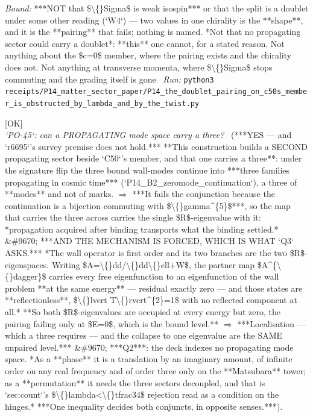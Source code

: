\begin{description}
 \emph{Bound:}  ***NOT that \$\textbackslash\{\}Sigma\$ is weak isospin*** or that the split is a doublet under some other reading (`W4`) --- two values in one chirality is the **shape**, and it is the **pairing** that fails; nothing is named. *Not that no propagating sector could carry a doublet*: **this** one cannot, for a stated reason. Not anything about the \$c=0\$ member, where the pairing exists and the chirality does not. Not anything at transverse momenta, where \$\textbackslash\{\}Sigma\$ stops commuting and the grading itself is gone
\ \emph{Run:} \texttt{python3 receipts/P14\_matter\_sector\_paper/P14\_the\_doublet\_pairing\_on\_c50s\_member\_is\_obstructed\_by\_lambda\_and\_by\_the\_twist.py}
\item[\rcptlabel{P14_the_propagating_three_is_inherited_and_the_pairing_fails_only_at_the_bound_energy}{P14R82}\textbf{P14R82}\quad\texttt{P14\_the\_propagating\_three\_is\_inherited\_and\_the\_pairing\_fails\_only\_at\_the\_bound\_energy}]\hfill\textsf{[OK]}\\
\textit{`PO-45`: can a PROPAGATING mode space carry a three?} \ (***YES --- and `r6695`'s survey premise does not hold.*** **This construction builds a SECOND propagating sector beside `C50`'s member, and that one carries a three**: under the signature flip the three bound wall-modes continue into ***three families propagating in cosmic time*** (`P14\_B2\_zeromode\_continuation`), a three of **modes** and not of marks. \ensuremath{\Rightarrow} ***It fails the conjunction because the continuation is a bijection commuting with \$\textbackslash\{\}gamma\textasciicircum{}\{5\}\$***, so the map that carries the three across carries the single \$R\$-eigenvalue with it: *propagation acquired after binding transports what the binding settled.* \&\#9670;  ***AND THE MECHANISM IS FORCED, WHICH IS WHAT `Q3` ASKS.*** *The wall operator is first order and its two branches are the two \$R\$-eigenspaces. Writing \$A=\textbackslash\{\}dd/\textbackslash\{\}dd\textbackslash\{\}ell+W\$, the partner map \$A\textasciicircum{}\{\textbackslash\{\}dagger\}\$ carries every free eigenfunction to an eigenfunction of the wall problem **at the same energy** --- residual exactly zero --- and those states are **reflectionless**, \$\textbackslash\{\}lvert T\textbackslash\{\}rvert\textasciicircum{}\{2\}=1\$ with no reflected component at all.* **So both \$R\$-eigenvalues are occupied at every energy but zero, the pairing failing only at \$E=0\$, which is the bound level.** \ensuremath{\Rightarrow} ***Localisation --- which a three requires --- and the collapse to one eigenvalue are the SAME unpaired level.*** \&\#9670; ***Q2***: the deck indexes no propagating mode space. *As a **phase** it is a translation by an imaginary amount, of infinite order on any real frequency and of order three only on the **Matsubara** tower; as a **permutation** it needs the three sectors decoupled, and that is `sec:count`'s \$\textbackslash\{\}lambda<\textbackslash\{\}tfrac34\$ rejection read as a condition on the hinges.* ***One inequality decides both conjuncts, in opposite senses.***). 

\end{description}
